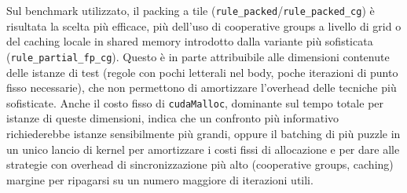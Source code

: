 \documentclass[11pt,a4paper]{article}
\begin{document}
Sul benchmark utilizzato, il packing a tile (\texttt{rule\_packed}/\texttt{rule\_packed\_cg}) è
risultata la scelta più efficace, più dell'uso di cooperative groups a livello di grid o del
caching locale in shared memory introdotto dalla variante più sofisticata
(\texttt{rule\_partial\_fp\_cg}). Questo è in parte attribuibile alle dimensioni contenute delle
istanze di test (regole con pochi letterali nel body, poche iterazioni di punto fisso necessarie),
che non permettono di amortizzare l'overhead delle tecniche più sofisticate. Anche il costo fisso di
\texttt{cudaMalloc}, dominante sul tempo totale per istanze di queste dimensioni, indica che un
confronto più informativo richiederebbe istanze sensibilmente più grandi, oppure il batching di più
puzzle in un unico lancio di kernel per amortizzare i costi fissi di allocazione e per dare alle
strategie con overhead di sincronizzazione più alto (cooperative groups, caching) margine per
ripagarsi su un numero maggiore di iterazioni utili.
\end{document}
